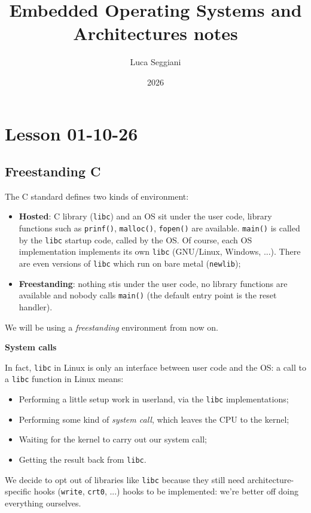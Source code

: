 \documentclass[a4paper,11pt]{article}
\title{Embedded Operating Systems and Architectures notes}
\author{Luca Seggiani}
\date{2026}
\begin{document}
\section{Lesson 01-10-26}

\thispagestyle{empty}
\pagestyle{fancy}

\subsection{Freestanding C}

\lstset{language=c}

The C standard defines two kinds of environment:
\begin{itemize}
	\item \textbf{Hosted}: C library (\texttt{libc}) and an OS sit under the user code, library functions such as \lstinline|prinf()|, \lstinline|malloc()|, \lstinline|fopen()| are available. \lstinline|main()| is called by the \texttt{libc} startup code, called by the OS. Of course, each OS implementation implements its own \texttt{libc} (GNU/Linux, Windows, ...). There are even versions of \texttt{libc} which run on bare metal (\texttt{newlib});
	\item \textbf{Freestanding}: nothing stis under the user code, no library functions are available and nobody calls \lstinline|main()| (the default entry point is the reset handler).
\end{itemize}

We will be using a \textit{freestanding} environment from now on.

\par\smallskip
\textbf{\textsf{System calls}}

In fact, \texttt{libc} in Linux is only an interface between user code and the OS: a call to a \texttt{libc} function in Linux means:
\begin{itemize}
	\item Performing a little setup work in userland, via the \texttt{libc} implementations;
	\item Performing some kind of \textit{system call}, which leaves the CPU to the kernel;
	\item Waiting for the kernel to carry out our system call;
	\item Getting the result back from \texttt{libc}.
\end{itemize}

We decide to opt out of libraries like \texttt{libc} because they still need architecture-specific hooks (\texttt{write}, \texttt{crt0}, ...) hooks to be implemented: we're better off doing everything ourselves.
\end{document}
